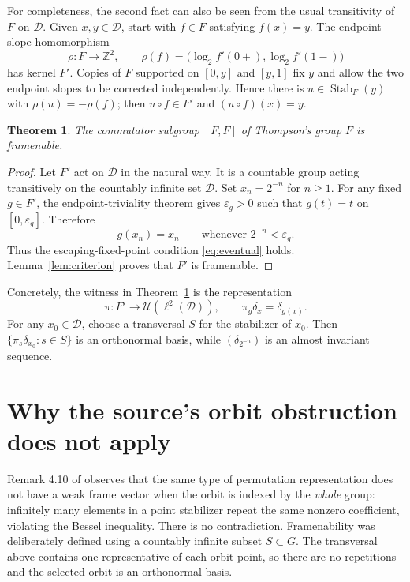 \documentclass[11pt]{article}
\newtheorem{theorem}{Theorem}
\newcommand{\D}{\mathcal D}
\begin{document}
For completeness, the second fact can also be seen from the usual transitivity of $F$ on $\D$.  Given $x,y\in\D$, start with $f\in F$ satisfying $f(x)=y$.  The endpoint-slope homomorphism
\[
 \rho:F\longrightarrow\mathbb Z^2,
 \qquad
 \rho(f)=\bigl(\log_2 f'(0+),\log_2 f'(1-)\bigr)
\]
has kernel $F'$.  Copies of $F$ supported on $[0,y]$ and $[y,1]$ fix $y$ and allow the two endpoint slopes to be corrected independently.  Hence there is $u\in\operatorname{Stab}_F(y)$ with $\rho(u)=-\rho(f)$; then $u\circ f\in F'$ and $(u\circ f)(x)=y$.

\begin{theorem}\label{thm:main}
The commutator subgroup $[F,F]$ of Thompson's group $F$ is framenable.
\end{theorem}

\begin{proof}
Let $F'$ act on $\D$ in the natural way.  It is a countable group acting transitively on the countably infinite set $\D$.  Set $x_n=2^{-n}$ for $n\geq1$.  For any fixed $g\in F'$, the endpoint-triviality theorem gives $\varepsilon_g>0$ such that $g(t)=t$ on $[0,\varepsilon_g]$.  Therefore
\[
 g(x_n)=x_n\qquad\text{whenever }2^{-n}<\varepsilon_g.
\]
Thus the escaping-fixed-point condition \eqref{eq:eventual} holds.  Lemma~\ref{lem:criterion} proves that $F'$ is framenable.
\end{proof}

Concretely, the witness in Theorem~\ref{thm:main} is the representation
\[
 \pi:F'\to\mathcal U(\ell^2(\D)),\qquad
 \pi_g\delta_x=\delta_{g(x)}.
\]
For any $x_0\in\D$, choose a transversal $S$ for the stabilizer of $x_0$.  Then $\{\pi_s\delta_{x_0}:s\in S\}$ is an orthonormal basis, while $(\delta_{2^{-n}})$ is an almost invariant sequence.

\section*{Why the source's orbit obstruction does not apply}
Remark 4.10 of \cite{Source} observes that the same type of permutation representation does not have a weak frame vector when the orbit is indexed by the \emph{whole} group: infinitely many elements in a point stabilizer repeat the same nonzero coefficient, violating the Bessel inequality.  There is no contradiction.  Framenability was deliberately defined using a countably infinite subset $S\subset G$.  The transversal above contains one representative of each orbit point, so there are no repetitions and the selected orbit is an orthonormal basis.
\end{document}
